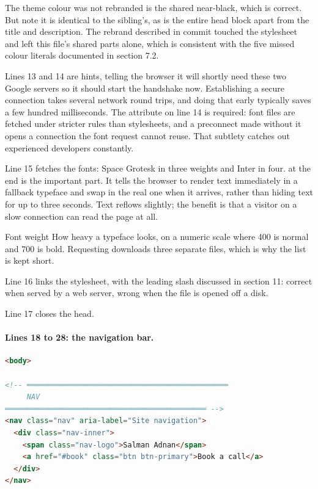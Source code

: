 \begin{honest}{The theme colour was not rebranded}
 is the shared near-black, which is correct. But note it is
identical to the sibling's, as is the entire head block apart from the title and
description. The rebrand described in commit  touched the stylesheet
and left this file's shared parts alone, which is consistent with the five missed
colour literals documented in section 7.2.
\end{honest}

Lines 13 and 14 are  hints, telling the browser it will shortly
need these two Google servers so it should start the handshake now. Establishing a
secure connection takes several network round trips, and doing that early typically
saves a few hundred milliseconds. The  attribute on line 14 is
required: font files are fetched under stricter rules than stylesheets, and a
preconnect made without it opens a connection the font request cannot reuse. That
subtlety catches out experienced developers constantly.

Line 15 fetches the fonts: Space Grotesk in three weights and Inter in four.
 at the end is the important part. It tells the browser to render
text immediately in a fallback typeface and swap in the real one when it arrives,
rather than hiding text for up to three seconds. Text reflows slightly; the benefit
is that a visitor on a slow connection can read the page at all.

\begin{jargon}{Font weight}
How heavy a typeface looks, on a numeric scale where 400 is normal and 700 is bold.
Requesting  downloads three separate files, which is why the
list is kept short.
\end{jargon}

Line 16 links the stylesheet, with the leading slash discussed in section 11: correct
when served by a web server, wrong when the file is opened off a disk.

Line 17 closes the head.

\paragraph{Lines 18 to 28: the navigation bar.}

\begin{lstlisting}[language=HTML,firstnumber=18,caption={\file{index.html}, lines 18--28}]
<body>

<!-- ══════════════════════════════════════════════
     NAV
══════════════════════════════════════════════ -->
<nav class="nav" aria-label="Site navigation">
  <div class="nav-inner">
    <span class="nav-logo">Salman Adnan</span>
    <a href="#book" class="btn btn-primary">Book a call</a>
  </div>
</nav>
\end{lstlisting}

